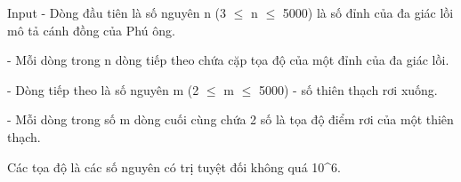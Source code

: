 Input
- Dòng đầu tiên là số nguyên n (3  $\le$  n  $\le$  5000) là số đỉnh của đa giác lồi mô tả cánh đồng của Phú ông.   


   - Mỗi dòng trong n dòng tiếp theo chứa cặp tọa độ của một đỉnh của đa giác lồi.   


   - Dòng tiếp theo là số nguyên m (2  $\le$  m  $\le$  5000) - số thiên thạch rơi xuống.   


   - Mỗi dòng trong số m dòng cuối cùng chứa 2 số là tọa độ điểm rơi của một thiên thạch.   


   Các tọa độ là các số nguyên có trị tuyệt đối không quá 10^6.
